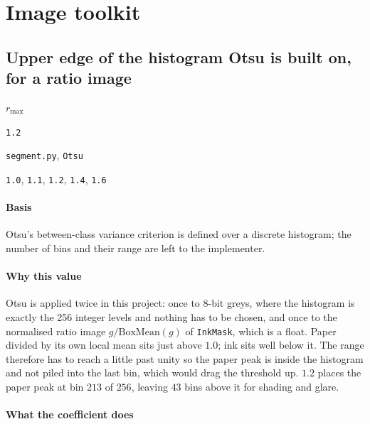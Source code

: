 \section{Image toolkit}

\subsection{Upper edge of the histogram Otsu is built on, for a ratio image}

\label{coef:otsu-hi}

\begin{description}[leftmargin=5.2em,style=sameline]

\item[Symbol] $r_{\max}$

\item[Value] \texttt{1.2}

\item[Source] \texttt{segment.py}, \texttt{Otsu}

\item[Swept] \texttt{1.0}, \texttt{1.1}, \texttt{1.2}, \texttt{1.4}, \texttt{1.6}

\end{description}

\paragraph{Basis}

Otsu's between-class variance criterion \cite[p.~63]{otsu1979} is defined over a discrete histogram; the number of bins and their range are left to the implementer.

\paragraph{Why this value}

Otsu is applied twice in this project: once to 8-bit greys, where the histogram is exactly the 256 integer levels and nothing has to be chosen, and once to the normalised ratio image $g/\mathrm{BoxMean}(g)$ of \texttt{InkMask}, which is a float. Paper divided by its own local mean sits just above $1.0$; ink sits well below it. The range therefore has to reach a little past unity so the paper peak is inside the histogram and not piled into the last bin, which would drag the threshold up. $1.2$ places the paper peak at bin $213$ of $256$, leaving $43$ bins above it for shading and glare.

\paragraph{What the coefficient does}

